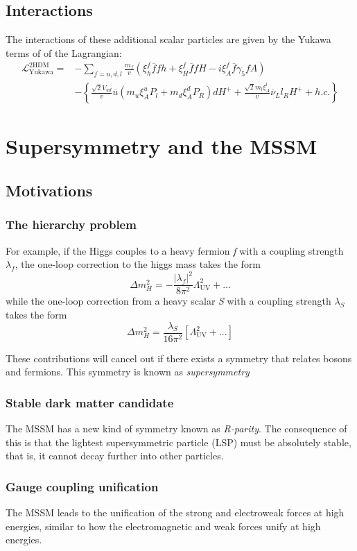 \subsection{Interactions}

The interactions of these additional scalar particles are given by the Yukawa terms of of the Lagrangian:
\begin{align*}
\mathcal{L}^{\mathrm{2HDM}}_{\text{Yukawa}} =& - \sum_{f = u, d, l} \frac{m_f}{v}
\left(\xi_h^f \overline{f}fh+\xi_H^f \overline{f}fH-i\xi_A^f \overline{f}\gamma_5fA \right)\\
&-\left\{\frac{\sqrt{2}V_{ud}}{v}\overline{u}\left(m_u\xi_A^uP_l+m_d\xi_A^dP_R\right)dH^+ + \frac{\sqrt{2}m_l\xi^l_A}{v}\overline{\nu}_Ll_RH^+ + h.c.\right\}
\end{align*}
\section{Supersymmetry and the MSSM}\label{sec:supersymmetry}
\subsection{Motivations}
\subsubsection{The hierarchy problem}

For example, if the Higgs couples to a heavy fermion \emph{f} with a coupling strength $\lambda_f$, the one-loop correction to the higgs mass takes the form
\[\Delta m_H^2 = -\frac{|\lambda_f|^2}{8\pi^2}\Lambda_\text{UV}^2 + ...\]
while the one-loop correction from a heavy scalar \emph{S} with a coupling strength $\lambda_S$ takes the form
\[\Delta m_H^2 = \frac{\lambda_S}{16\pi^2}\left[\Lambda_\text{UV}^2 + ...\right]\]

These contributions will cancel out if there exists a symmetry that relates bosons and fermions. This symmetry is known as \emph{supersymmetry}
\subsubsection{Stable dark matter candidate}
The MSSM has a new kind of symmetry known as \emph{R-parity}. The consequence of this is that the lightest supersymmetric particle (LSP) must be absolutely stable, that is, it cannot decay further into other particles.
\subsubsection{Gauge coupling unification}
The MSSM leads to the unification of the strong and electroweak forces at high energies, similar to how the electromagnetic and weak forces unify at high energies.

